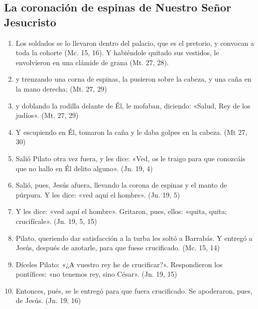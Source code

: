 \documentclass[a4paper,11pt]{article}
\begin{document}
    \subsection*{\hfil La coronación de espinas de Nuestro Señor Jesucristo \hfil}
      
      \begin{enumerate}

        \item Los soldados se lo llevaron dentro del palacio, que es el pretorio, y convocan a toda la cohorte (Mc. 15, 16).
        Y habiéndole quitado sus vestidos, le envolvieron en una clámide de grana (Mt. 27, 28).

        \item y trenzando una corna de espinas, la pusieron sobre la cabeza, y una caña en la mano derecha; (Mt. 27, 29)

        \item y doblando la rodilla delante de Él, le mofaban, diciendo: «Salud, Rey de los judíos». (Mt. 27, 29)

        \item Y escupiendo en Él, tomaron la caña y le daba golpes en la cabeza. (Mt 27, 30)

        \item Salió Pilato otra vez fuera, y les dice: «Ved, os le traigo para que conozcáis que no hallo en Él delito alguno». (Jn. 19, 4)

        \item Salió, pues, Jesús afuera, llevando la corona de espinas y el manto de púrpura. Y les dice: «ved aquí el hombre». (Jn. 19, 5)

        \item Y les dice: «ved aquí el hombre». Gritaron, pues, ellos: «quita, quita; crucifícale». (Jn. 19, 5, 15)

        \item Pilato, queriendo dar satisfacción a la turba les soltó a Barrabás. Y entregó a Jesús, después de azotarle, para que fuese crucificado. (Mc. 15, 14)

        \item Díceles Pilato: «¿A vuestro rey he de crucificar?». Respondieron los pontífices: «no tenemos rey, sino César». (Jn. 19, 15)

        \item Entonces, pués, se le entregó para que fuera crucificado. Se apoderaron, pues, de Jesús. (Jn. 19, 16)

      \end{enumerate}
\end{document}
